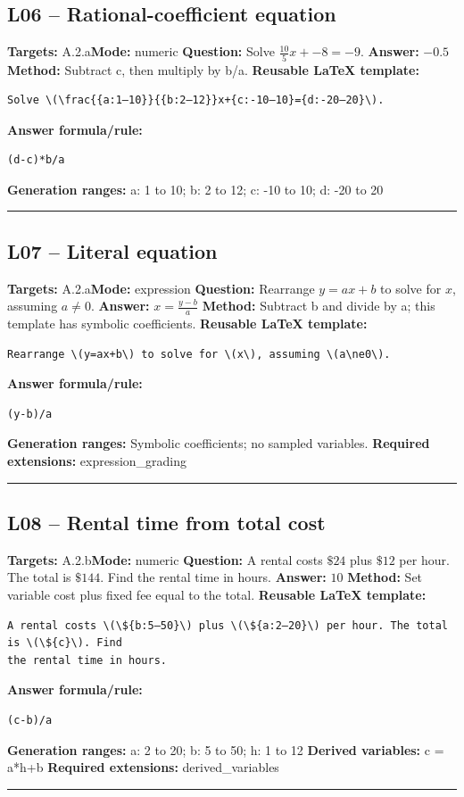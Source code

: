\documentclass[11pt]{article}
\begin{document}
\subsection{L06 -- Rational-coefficient equation}
\textbf{Targets:} A.2.a\quad\textbf{Mode:} numeric
\textbf{Question:} Solve \(\frac{10}{5}x+-8=-9\).
\textbf{Answer:} \(-0.5\)
\textbf{Method:} Subtract c, then multiply by b/a.
\textbf{Reusable LaTeX template:}
\begin{verbatim}
Solve \(\frac{{a:1–10}}{{b:2–12}}x+{c:-10–10}={d:-20–20}\).
\end{verbatim}
\textbf{Answer formula/rule:}
\begin{verbatim}
(d-c)*b/a
\end{verbatim}
\textbf{Generation ranges:} a: 1 to 10; b: 2 to 12; c: -10 to 10; d: -20 to 20
\medskip\hrule\medskip
\subsection{L07 -- Literal equation}
\textbf{Targets:} A.2.a\quad\textbf{Mode:} expression
\textbf{Question:} Rearrange \(y=ax+b\) to solve for \(x\), assuming \(a\ne0\).
\textbf{Answer:} \(x=\frac{y-b}{a}\)
\textbf{Method:} Subtract b and divide by a; this template has symbolic coefficients.
\textbf{Reusable LaTeX template:}
\begin{verbatim}
Rearrange \(y=ax+b\) to solve for \(x\), assuming \(a\ne0\).
\end{verbatim}
\textbf{Answer formula/rule:}
\begin{verbatim}
(y-b)/a
\end{verbatim}
\textbf{Generation ranges:} Symbolic coefficients; no sampled variables.
\textbf{Required extensions:} expression\_grading
\medskip\hrule\medskip
\subsection{L08 -- Rental time from total cost}
\textbf{Targets:} A.2.b\quad\textbf{Mode:} numeric
\textbf{Question:} A rental costs \(\$24\) plus \(\$12\) per hour. The total is \(\$144\). Find the rental time in hours.
\textbf{Answer:} \(10\)
\textbf{Method:} Set variable cost plus fixed fee equal to the total.
\textbf{Reusable LaTeX template:}
\begin{verbatim}
A rental costs \(\${b:5–50}\) plus \(\${a:2–20}\) per hour. The total is \(\${c}\). Find
the rental time in hours.
\end{verbatim}
\textbf{Answer formula/rule:}
\begin{verbatim}
(c-b)/a
\end{verbatim}
\textbf{Generation ranges:} a: 2 to 20; b: 5 to 50; h: 1 to 12
\textbf{Derived variables:} c = a*h+b
\textbf{Required extensions:} derived\_variables
\medskip\hrule\medskip
\end{document}
